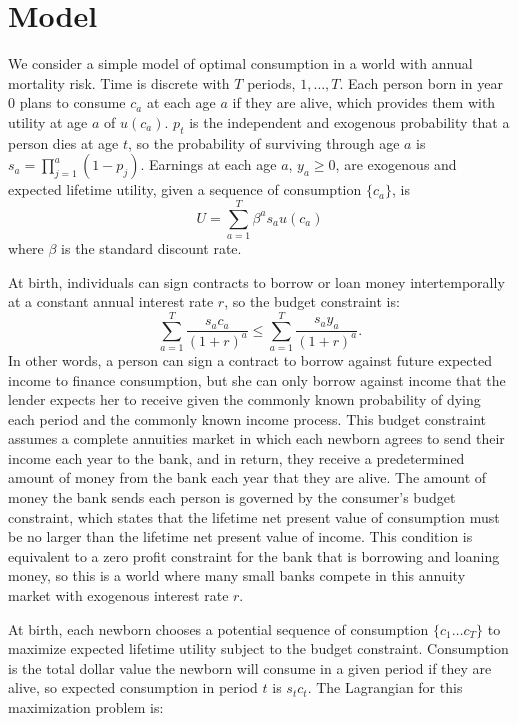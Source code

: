\documentclass[12pt]{article}
\begin{document}

\section{Model}

We consider a simple model of optimal consumption in a world with annual mortality risk. 
Time is discrete with $T$ periods, $1,\dots,T$. 
Each person born in year 0 plans to consume $c_a$ at each age $a$ if they are alive, which provides them with utility at age $a$ of $u(c_a)$. 
$p_t$ is the independent and exogenous probability that a person dies at age $t$, so the probability of surviving through age $a$ is $s_a=\prod\limits_{j=1}^a (1-p_j)$. 
Earnings at each age $a$, $y_a\geq 0$, are exogenous and expected lifetime utility, given a sequence of consumption $\{c_a\}$, is \[U=\sum\limits_{a=1}^T \beta^as_au(c_a)\] where $\beta$ is the standard discount rate.

At birth, individuals can sign contracts to borrow or loan money intertemporally at a constant annual interest rate $r$, so the budget constraint is: $$\sum\limits_{a=1}^T \frac{s_ac_a}{(1+r)^a} \leq \sum\limits_{a=1}^T \frac{s_ay_a}{(1+r)^a}.$$ 
In other words, a person can sign a contract to borrow against future expected income to finance consumption, but she can only borrow against income that the lender expects her to receive given the commonly known probability of dying each period and the commonly known income process. 
This budget constraint assumes a complete annuities market in which each newborn agrees to send their income each year to the bank, and in return, they receive a predetermined amount of money from the bank each year that they are alive. 
The amount of money the bank sends each person is governed by the consumer's budget constraint, which states that the lifetime net present value of consumption must be no larger than the lifetime net present value of income. 
This condition is equivalent to a zero profit constraint for the bank that is borrowing and loaning money, so this is a world where many small banks compete in this annuity market with exogenous interest rate $r$.

At birth, each newborn chooses a potential sequence of consumption $\{c_1\dots c_T\}$ to maximize expected lifetime utility subject to the budget constraint. 
Consumption is the total dollar value the newborn will consume in a given period if they are alive, so expected consumption in period $t$ is $s_tc_t$. 
The Lagrangian for this maximization problem is:
\end{document}
